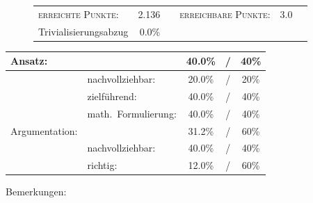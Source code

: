 \documentclass{article}
\begin{document}
\vspace{-0.5cm}
\begin{figure}[h!]
\begin{tabular}{lrcrcr}
\textsc{erreichte Punkte:} &2.136& & \textsc{erreichbare Punkte:} &3.0\\
\small Trivialisierungsabzug  & 0.0\% & & &
\end{tabular}
\end{figure}
\vspace{-0.1cm}
\begin{minipage}[t]{0.6\textwidth}
\flushleft
\begin{tabular}{l|lccc}
Ansatz:& &40.0\%&/&40\%\\\hline
&nachvollziehbar:&20.0\%&/&20\%\\
&zielf{\"u}hrend:&40.0\%&/&40\%\\
&math.~Formulierung:& 40.0\%&/&40\%\\\hline\hline
Argumentation:& &31.2\%&/&60\%\\\hline
&nachvollziehbar:&40.0\%&/&40\%\\
&richtig:&12.0\%&/&60\%\\\hline
\end{tabular}
\end{minipage}
\hfill
\begin{minipage}[t]{0.4\textwidth}
	\vspace{-1.75cm}
	Bemerkungen:\\\vspace*{0.2cm}
	\underline{\hspace{0.95\textwidth}}\\\vspace*{0.2cm}
	\underline{\hspace{0.95\textwidth}}
	\\\vspace*{0.2cm}
	\underline{\hspace{0.95\textwidth}}
	\\\vspace*{0.2cm}
	\underline{\hspace{0.95\textwidth}}
	\\\vspace*{0.2cm}
	\underline{\hspace{0.95\textwidth}}
\end{minipage}
	\vspace{0.5cm}\clearpage
\end{document}
